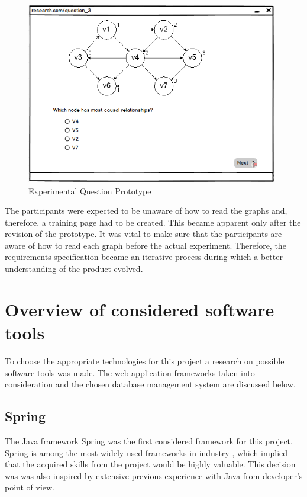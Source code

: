\documentclass{l4proj}
\begin{document}
\begin{figure}[H]
\centering
\includegraphics[width=11cm]{researchQuestion.PNG}
\caption{Experimental Question Prototype}
\label{researchQuestion}
\end{figure}
 
The participants were expected to be unaware of how to read the graphs and, therefore, a training page had to be created. This became apparent only after the revision of the prototype. It was vital to make sure that the participants are aware of how to read each graph before the actual experiment. Therefore, the requirements specification became an iterative process during which a better understanding of the product evolved.

\section{Overview of considered software tools}

To choose the appropriate technologies for this project a research on possible software tools was made. The web application frameworks taken into consideration and the chosen database management system are discussed below. 

\subsection{Spring}

The Java framework Spring was the first considered framework for this project. Spring is among the most widely used frameworks in industry \cite{shiLuiLi}, which implied that the acquired skills from the project would be highly valuable. This decision was was also inspired by extensive previous experience with Java from developer's point of view. 
\end{document}
